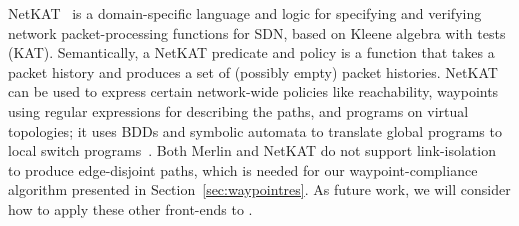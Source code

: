 NetKAT~\cite{netkat} is a domain-specific language and logic for 
specifying and verifying network packet-processing functions
for SDN, based on Kleene algebra with tests (KAT). Semantically,
a NetKAT predicate and policy is a function that takes a packet
history and produces a set of (possibly empty) packet histories. 
NetKAT can be used to express certain network-wide policies like 
reachability, waypoints using regular expressions for describing the paths, 
and programs on virtual topologies; it uses
BDDs and symbolic automata to translate global programs to local
switch programs~\cite{netkatcompiler}.
Both Merlin and NetKAT  do not support link-isolation 
to produce edge-disjoint paths, which is needed for  
our waypoint-compliance algorithm presented in Section~\ref{sec:waypointres}.
As future work, we will consider 
how to apply these other front-ends to \name.



 
